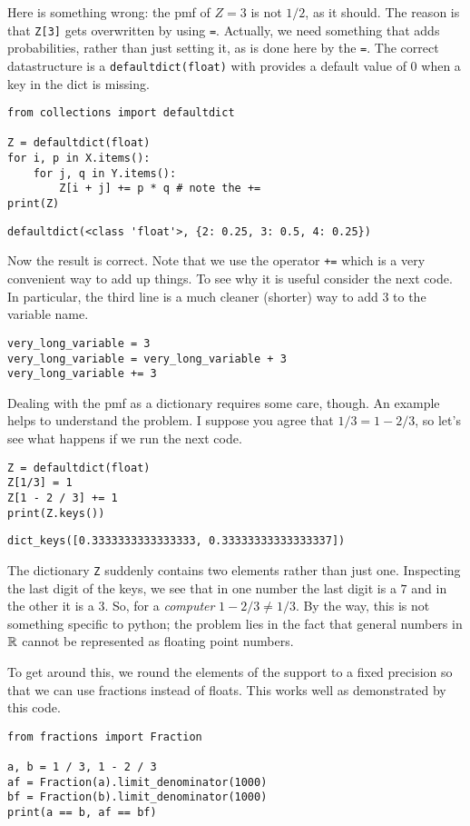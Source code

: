 \documentclass[stochastic-or]{subfiles}
\begin{document}
Here is something wrong: the pmf of \(Z=3\) is not \(1/2\), as it should.
The reason is that \texttt{Z[3]} gets overwritten by using \texttt{=}.
Actually, we need something that adds probabilities, rather than just setting it, as is done here by the \texttt{=}.
The correct datastructure is a \texttt{defaultdict(float)} with provides a default value of \(0\) when a key in the dict is missing.
\begin{verbatim}
from collections import defaultdict

Z = defaultdict(float)
for i, p in X.items():
    for j, q in Y.items():
        Z[i + j] += p * q # note the +=
print(Z)
\end{verbatim}

\begin{verbatim}
defaultdict(<class 'float'>, {2: 0.25, 3: 0.5, 4: 0.25})
\end{verbatim}

Now the result is correct.
Note that we use the operator \texttt{+=} which is a very convenient way to add up things.
To see why it is useful consider the next code.
In particular, the third line is a much cleaner (shorter) way to add \(3\) to the variable name.
\begin{verbatim}
very_long_variable = 3
very_long_variable = very_long_variable + 3
very_long_variable += 3
\end{verbatim}

Dealing with the pmf as a dictionary requires some care, though.
An example helps to understand the problem.
I suppose you agree that \(1/3 = 1-2/3\), so let's see what happens if we run the next code.
\begin{verbatim}
Z = defaultdict(float)
Z[1/3] = 1
Z[1 - 2 / 3] += 1
print(Z.keys())
\end{verbatim}

\begin{verbatim}
dict_keys([0.3333333333333333, 0.33333333333333337])
\end{verbatim}

The dictionary \texttt{Z} suddenly contains two elements rather than just one.
Inspecting the last digit of the keys, we see that in one number the last digit is a \(7\) and in the other it is a \(3\).
So, for a \emph{computer} \(1-2/3 \neq 1/3\).
By the way, this is not something specific to python; the problem lies in the fact that general numbers in \(\mathbb{R}\) cannot be represented as floating point numbers.

To get around this, we round the elements of the support to a fixed precision so that we can use fractions instead of floats.
This works well as demonstrated by this code.
\begin{verbatim}
from fractions import Fraction

a, b = 1 / 3, 1 - 2 / 3
af = Fraction(a).limit_denominator(1000)
bf = Fraction(b).limit_denominator(1000)
print(a == b, af == bf)
\end{verbatim}
\end{document}
